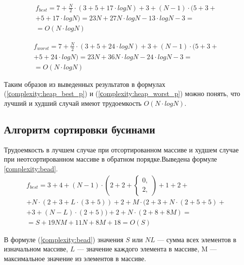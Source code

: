 \begin{equation}
	\label{сomplexity:heap_best_p}
	\begin{gathered}
		f_{best} = 7 + \frac{N}{2} \cdot (3 + 5 + 17 \cdot log N) + 3 + (N - 1) \cdot (5 + 3 + \\ 
		+ 5 + 17 \cdot log N) = 23N + 27N \cdot log N - 13 \cdot log N - 3 =\\
		= O(N \cdot log N)
	\end{gathered}
\end{equation}

\begin{equation}
	\label{сomplexity:heap_worst_p}
	\begin{gathered}
		f_{worst} = 7 + \frac{N}{2} \cdot (3 + 5 + 24 \cdot log N) + 3 + (N - 1) \cdot (5 + 3 + \\ 
		+ 5 + 24 \cdot log N) = 23N + 36N \cdot log N - 24 \cdot log N - 3 =\\
		= O(N \cdot log N)
	\end{gathered}
\end{equation}

Таким образов из выведенных результатов в формулах (\ref{сomplexity:heap_best_p}) и (\ref{сomplexity:heap_worst_p}) можно понять, что лучший и худший случай имеют трудоемкость $O(N \cdot log N)$.

\subsection{Алгоритм сортировки бусинами}

Трудоемкость в лучшем случае при отсортированном массиве и худшем случае при неотсортированном массиве в обратном порядке.Выведена формуле \ref{сomplexity:bead}.
\begin{equation}
	\label{сomplexity:bead}
	\begin{gathered}
		f_{best} = 3 + 4 + (N - 1) \cdot (2 + 2 + 
		\begin{cases}
			0, \\
			2,
		\end{cases}) 
		+ 1 + 2 + \\
		+ N \cdot (2 + 3 + L \cdot (3 + 5)) + 2 + M \cdot (2 + 3 + N \cdot (2 + 5 + 5) + \\
		+3 + (N - L) \cdot (2 + 5)) + 2 + N \cdot (2 + 8 + 8M) = \\
		= S + 19NM + 11N + 8M + 18 = O(S)
	\end{gathered}
\end{equation}

В формуле (\ref{сomplexity:bead}) значения $S$ или $NL$ --- сумма всех элементов в изначальном массиве, $L$ --- значение каждого элемента в массиве,  M --- максимальное значение из элементов в массиве.

